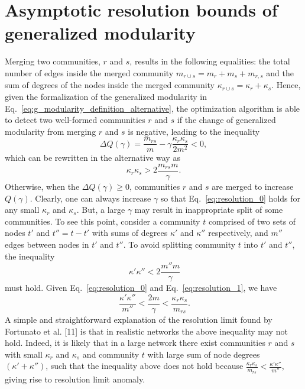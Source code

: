 \section{Asymptotic resolution bounds of generalized modularity} \label{sec:2.3}
Merging two communities, $r$ and $s$, results in the following equalities: the total number of edges inside the merged community $m_{r\cup s}=m_r+m_s+m_{r,s}$ and the sum of degrees of the nodes inside the merged community $\kappa_{r\cup s} = \kappa_r+\kappa_s$. Hence, given the formalization of the generalized modularity in Eq.~\ref{eq:g_modularity_definition_alternative}, the optimization algorithm is able to detect two well-formed communities $r$ and $s$ if the change of generalized modularity from merging $r$ and $s$ is negative, leading to the inequality
\begin{equation}
\Delta Q(\gamma) = \frac{m_{rs}}{m} - \gamma \frac{\kappa_{r}\kappa_{s}}{2m^2} < 0,
\end{equation}
which can be rewritten in the alternative way as
\begin{equation}\label{eq:resolution_0}
\kappa_{r}\kappa_{s} > 2 \frac{m_{rs} m} {\gamma}.
\end{equation}
Otherwise, when the $\Delta Q(\gamma) \geq 0$, communities $r$ and $s$ are merged to increase $Q(\gamma)$. Clearly, one can always increase $\gamma$ so that Eq.~\ref{eq:resolution_0} holds for any small $\kappa_r$ and $\kappa_s$. But, a large $\gamma$ may result in inappropriate split of some communities. To see this point, consider a community $t$ comprised of two sets of nodes $t'$ and $t''=t-t'$ with sums of degrees $\kappa'$ and $\kappa''$ respectively, and $m''$ edges between nodes in $t'$ and $t''$. To avoid splitting community $t$ into $t'$ and $t''$, the inequality
\begin{equation}~\label{eq:resolution_1}
\kappa'\kappa'' < 2\frac{m''m}{\gamma}
\end{equation}
must hold. Given Eq.~\ref{eq:resolution_0} and Eq.~\ref{eq:resolution_1}, we have
\begin{equation} ~\label{eq:resolution}
  \frac{\kappa'\kappa''}{m''} < \frac{2m}{\gamma} < \frac{\kappa_r \kappa_s}{m_{rs}}.  
\end{equation}
A simple and straightforward explanation of the resolution limit found by Fortunato et al. [11] is that in realistic networks the above inequality may not hold. Indeed, it is likely that in a large network there exist communities $r$ and $s$ with small $\kappa_r$ and $\kappa_s$ and community $t$ with large sum of node degrees $(\kappa'+\kappa'')$, such that the inequality above does not hold because $\frac{\kappa_r \kappa_s}{m_{rs}} < \frac{\kappa'\kappa''}{m''}$, giving rise to resolution limit anomaly.

